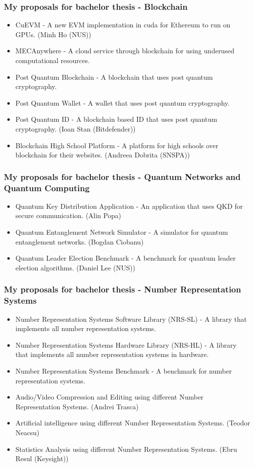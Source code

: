 \begin{frame}
\frametitle{My proposals for bachelor thesis - Blockchain}
\begin{itemize}
    \item CuEVM - A new EVM implementation in cuda for Ethereum to run on GPUs. (Minh Ho (NUS))
    \item MECAnywhere - A cloud service through blockchain for using underused computational resources.
    \item Post Quantum Blockchain - A blockchain that uses post quantum cryptography.
    \item Post Quantum Wallet - A wallet that uses post quantum cryptography.
    \item Post Quantum ID - A blockchain based ID that uses post quantum cryptography. (Ioan Stan (Bitdefender))
    \item Blockchain High School Platform - A platform for high schools over blockchain for their websites. (Andreea Dobrita (SNSPA))
\end{itemize}
\end{frame}

\begin{frame}
\frametitle{My proposals for bachelor thesis - Quantum Networks and Quantum Computing}
\begin{itemize}
    \item Quantum Key Distribution Application - An application that uses QKD for secure communication. (Alin Popa)
    \item Quantum Entanglement  Network Simulator - A simulator for quantum entanglement networks. (Bogdan Ciobanu)
    \item Quantum Leader Election Benchmark - A benchmark for quantum leader election algorithms. (Daniel Lee (NUS))
\end{itemize}
\end{frame}

\begin{frame}
\frametitle{My proposals for bachelor thesis - Number Representation Systems}
\begin{itemize}
    \item Number Representation Systems Software Library (NRS-SL) - A library that implements all number representation systems.
    \item Number Representation Systems Hardware Library (NRS-HL) - A library that implements all number representation systems in hardware.
    \item Number Representation Systems Benchmark - A benchmark for number representation systems.
    \item Audio/Video Compression and Editing  using different Number Representation Systems. (Andrei Trasca)
    \item Artificial intelligence  using different Number Representation Systems. (Teodor Neacsu)
    \item Statistics Analysis using different Number Representation Systems. (Ebru Resul (Keysight))
\end{itemize}
\end{frame}

